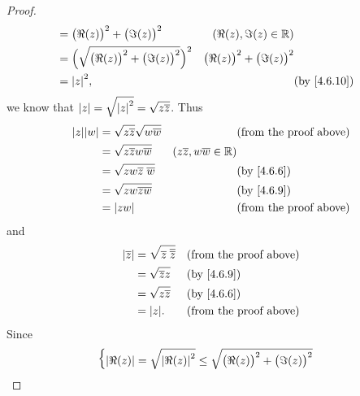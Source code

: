 \begin{proof}
\begin{align*}
                   & = \big(\Re(z)\big)^2 + \big(\Im(z)\big)^2                                                       & (\Re(z), \Im(z) \in \R)                                             \\
                   & = \Big(\sqrt{\big(\Re(z)\big)^2 + \big(\Im(z)\big)^2}\Big)^2                                    & \big(\Re(z)\big)^2 + \big(\Im(z)\big)^2                             \\
                   & = \abs{z}^2,                                                                                    &                                         & \text{(by \cref{4.6.10})}
  \end{align*}
  we know that \(\left\lvert z\right\rvert = \sqrt{\left\lvert z\right\rvert^2} = \sqrt{z \overline{z}}\).
  Thus
  \begin{align*}
    \abs{z} \abs{w} & = \sqrt{z \overline{z}} \sqrt{w \overline{w}} &                                         & \text{(from the proof above)} \\
                    & = \sqrt{z \overline{z} w \overline{w}}        & (z \overline{z}, w \overline{w} \in \R)                                 \\
                    & = \sqrt{zw \overline{z} \; \overline{w}}      &                                         & \text{(by \cref{4.6.6})}      \\
                    & = \sqrt{zw \overline{zw}}                     &                                         & \text{(by \cref{4.6.9})}      \\
                    & = \abs{zw}                                    &                                         & \text{(from the proof above)}
  \end{align*}
  and
  \begin{align*}
    \abs{\overline{z}} & = \sqrt{\overline{z} \; \overline{\overline{z}}} &  & \text{(from the proof above)} \\
                       & = \sqrt{\overline{z} z}                          &  & \text{(by \cref{4.6.9})}      \\
                       & = \sqrt{z \overline{z}}                          &  & \text{(by \cref{4.6.6})}      \\
                       & = \abs{z}.                                       &  & \text{(from the proof above)}
  \end{align*}
  Since
  \begin{align*}
             & \begin{dcases}
                 \abs{\Re(z)} = \sqrt{\abs{\Re(z)}^2} \leq \sqrt{\big(\Re(z)\big)^2 + \big(\Im(z)\big)^2} \\

\end{dcases}
\end{align*}
\end{proof}
